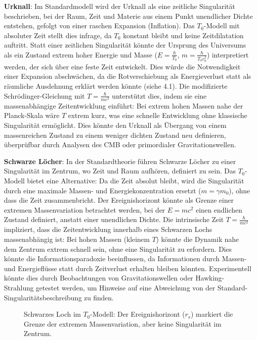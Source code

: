 \documentclass[a4paper,12pt]{article}
\begin{document}
	\textbf{Urknall}: Im Standardmodell wird der Urknall als eine zeitliche Singularität beschrieben, bei der Raum, Zeit und Materie aus einem Punkt unendlicher Dichte entstehen, gefolgt von einer raschen Expansion (Inflation). Das \( T_0 \)-Modell mit absoluter Zeit stellt dies infrage, da \( T_0 \) konstant bleibt und keine Zeitdilatation auftritt. Statt einer zeitlichen Singularität könnte der Ursprung des Universums als ein Zustand extrem hoher Energie und Masse (\( E = \frac{\hbar}{T_0} \), \( m = \frac{\hbar}{T_0 c_0^2} \)) interpretiert werden, der sich über eine feste Zeit entwickelt. Dies würde die Notwendigkeit einer Expansion abschwächen, da die Rotverschiebung als Energieverlust statt als räumliche Ausdehnung erklärt werden könnte (siehe 4.1). Die modifizierte Schrödinger-Gleichung mit \( T = \frac{\hbar}{m c^2} \) unterstützt dies, indem sie eine massenabhängige Zeitentwicklung einführt: Bei extrem hohen Massen nahe der Planck-Skala wäre \( T \) extrem kurz, was eine schnelle Entwicklung ohne klassische Singularität ermöglicht. Dies könnte den Urknall als Übergang von einem massenreichen Zustand zu einem weniger dichten Zustand neu definieren, überprüfbar durch Analysen des CMB oder primordialer Gravitationswellen.
	
	\textbf{Schwarze Löcher}: In der Standardtheorie führen Schwarze Löcher zu einer Singularität im Zentrum, wo Zeit und Raum aufhören, definiert zu sein. Das \( T_0 \)-Modell bietet eine Alternative: Da die Zeit absolut bleibt, wird die Singularität durch eine maximale Massen- und Energiekonzentration ersetzt (\( m = \gamma m_0 \)), ohne dass die Zeit zusammenbricht. Der Ereignishorizont könnte als Grenze einer extremen Massenvariation betrachtet werden, bei der \( E = m c^2 \) einen endlichen Zustand definiert, anstatt einer unendlichen Dichte. Die intrinsische Zeit \( T = \frac{\hbar}{m c^2} \) impliziert, dass die Zeitentwicklung innerhalb eines Schwarzen Lochs massenabhängig ist: Bei hohen Massen (kleinem \( T \)) könnte die Dynamik nahe dem Zentrum extrem schnell sein, ohne eine Singularität zu erfordern. Dies könnte die Informationsparadoxie beeinflussen, da Informationen durch Massen- und Energieflüsse statt durch Zeitverlust erhalten bleiben könnten. Experimentell könnte dies durch Beobachtungen von Gravitationswellen oder Hawking-Strahlung getestet werden, um Hinweise auf eine Abweichung von der Standard-Singularitätsbeschreibung zu finden.
	
	\begin{figure}[h]
		\centering
		\caption{Schwarzes Loch im $T_0$-Modell: Der Ereignishorizont ($r_s$) markiert die Grenze der extremen Massenvariation, aber keine Singularität im Zentrum.}
	\end{figure}
	
\end{document}
